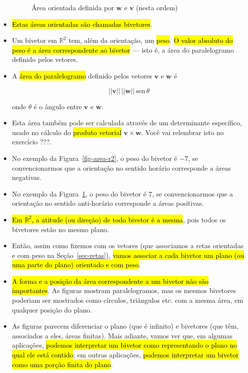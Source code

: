 \documentclass[
  letterpaper,
  DIV=11,
  numbers=noendperiod]{scrreprt}
\begin{document}
\begin{itemize}
\begin{figure}[t]
{  }

  \caption{\label{fig-area-r2-2}Área orientada definida por $\mathbf{w}$
  e $\mathbf{v}$ (nesta ordem)}

  \end{figure}
\item
  {\hl{Estas áreas orientadas são chamadas bivetores}}.
\item
  Um bivetor em $\mathbb{R}^2$ tem, além da orientação, um {\hl{peso}}.
  {\hl{O valor absoluto do peso é a área correspondente ao bivetor}} ---
  isto é, a área do paralelogramo definido pelos vetores.
\item
  A {\hl{área do paralelogramo}} definido pelos vetores $\mathbf{v}$ e
  $\mathbf{w}$ é

  \[
  ||\mathbf{v}||\, ||\mathbf{w}|| \,\text{sen}\,\theta
  \]

  onde $\theta$ é o ângulo entre $\mathbf{v}$ e $\mathbf{w}$.
\item
  Esta área também pode ser calculada através de um determinante
  específico, usado no cálculo do {\hl{produto vetorial}}
  $\mathbf{v} \times \mathbf{w}$. Você vai relembrar isto no exercício
  ???.
\item
  No exemplo da Figura~\ref{fig-area-r2}, o peso do bivetor é $-7$, se
  convencionarmos que a orientação no sentido horário corresponde a
  áreas negativas.
\item
  No exemplo da Figura~\ref{fig-area-r2-2}, o peso do bivetor é $7$, se
  convencionarmos que a orientação no sentido anti-horário corresponde a
  áreas positivas.
\item
  {\hl{Em $\mathbb{R}^2$, a atitude (ou direção) de todo bivetor é a
  mesma}}, pois todos os bivetores estão no mesmo plano.
\item
  Então, assim como fizemos com os vetores (que associamos a retas
  orientadas e com peso na Seção~\ref{sec-retas}), {\hl{vamos associar a
  cada bivetor um plano (ou uma parte do plano) orientado e com peso}}.
\item
  {\hl{A forma e a posição da área correspondente a um bivetor não são
  importantes}}. As figuras mostram paralelogramos, mas os mesmos
  bivetores poderiam ser mostrados como círculos, triângulos etc. com a
  mesma área, em qualquer posição do plano.
\item
  As figuras parecem diferenciar o plano (que é infinito) e bivetores
  (que têm, associados a eles, áreas finitas). Mais adiante, vamos ver
  que, em algumas aplicações, {\hl{podemos interpretar um bivetor como
  representando o plano no qual ele está contido}}; em outras
  aplicações, {\hl{podemos interpretar um bivetor como uma porção finita
  do plano}}.


\end{itemize}
\end{document}
